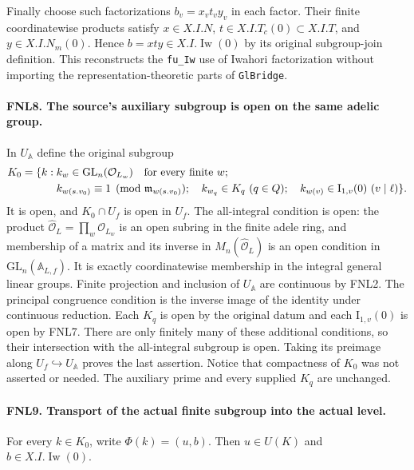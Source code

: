 \documentclass[11pt,a4paper]{article}
\numberwithin{equation}{section}
\theoremstyle{remark}\newtheorem{remark}[theorem]{Remark}
\begin{document}
Finally choose such factorizations \(b_v=x_vt_vy_v\) in each factor.
Their finite coordinatewise products satisfy
\(x\in X.I.N\), \(t\in X.I.T_c(0)\subset X.I.T\), and
\(y\in X.I.N_m(0)\).  Hence \(b=xty\in X.I.\operatorname{Iw}(0)\)
by its original subgroup-join definition.  This reconstructs the
\texttt{fu\_\allowbreak Iw} use of Iwahori factorization without importing the
representation-theoretic parts of \texttt{Gl\allowbreak Bridge}.

\paragraph{FNL8. The source's auxiliary subgroup is open on the same adelic group.}
\label{claim:FNL8}
In \(U_{\mathbb A}\) define the original subgroup
\[
 \begin{split}
 K_0=\{k:\;& k_w\in\mathrm{GL}_n(\mathcal O_{L_w})
                          \quad\hbox{for every finite }w;\\
 &k_{w(s.v_0)}\equiv1\pmod{\mathfrak m_{w(s.v_0)}};\quad
 k_{w_q}\in K_q\ (q\in Q);\quad
 k_{w(v)}\in\mathrm I_{1,\allowbreak{} v}(0)\ (v\mid\ell)\}.
 \end{split}
\]
It is open, and \(K_0\cap U_f\) is open in \(U_f\).
The all-integral condition is open: the product
\(\widehat{\mathcal O}_L=\prod_w\mathcal O_{L_w}\) is an open
subring in the finite adele ring, and membership of a matrix and its
inverse in \(M_n(\widehat{\mathcal O}_L)\) is an open condition in
\(\mathrm{GL}_n(\mathbb A_{L,\allowbreak{} f})\).  It is exactly coordinatewise
membership in the integral general linear groups.  Finite projection
and inclusion of \(U_{\mathbb A}\) are continuous by FNL2.
The principal congruence condition is the inverse image of the
identity under continuous reduction.  Each \(K_q\) is open by the
original datum and each \(\mathrm I_{1,\allowbreak{} v}(0)\) is open by FNL7.
There are only finitely many of these additional conditions, so their
intersection with the all-integral subgroup is open.  Taking its
preimage along \(U_f\hookrightarrow U_{\mathbb A}\) proves the last
assertion.  Notice that compactness of \(K_0\) was not asserted or
needed.  The auxiliary prime and every supplied \(K_q\) are unchanged.

\paragraph{FNL9. Transport of the actual finite subgroup into the actual level.}
\label{claim:FNL9}
For every \(k\in K_0\), write \(\Phi(k)=(u,\allowbreak{} b)\).  Then
\(u\in U(K)\) and \(b\in X.I.\operatorname{Iw}(0)\).
\end{document}
